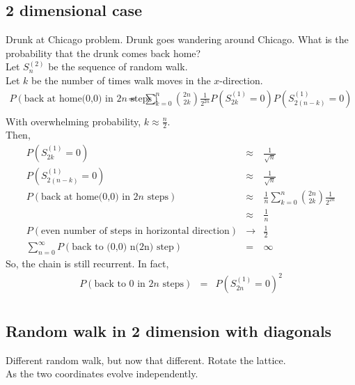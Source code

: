   \subsection*{2 dimensional case}
    Drunk at Chicago problem. Drunk goes wandering around Chicago.
    What is the probability that the drunk comes back home?\\
    Let $S_n^{(2)}$ be the sequence of random walk.\\
    Let $k$ be the number of times walk moves in the $x$-direction.
    \begin{eqnarray*}
      P(\text{back at home(0,0) in $2n$ steps})
      & = & \sum_{k = 0}^n \binom{2n}{2k} \frac{1}{2^{2n}} 
        P(S_{2k}^{(1)} = 0) P(S_{2(n-k)}^{(1)} = 0)\\
    \end{eqnarray*}
    With overwhelming probability, $k \approx \frac{n}{2}$.\\
    Then,
    \begin{eqnarray*}
      P(S_{2k}^{(1)} = 0) & \approx & \frac{1}{\sqrt{n}}\\
      P(S_{2(n - k)}^{(1)} = 0) & \approx & \frac{1}{\sqrt{n}}\\
      P(\text{back at home(0,0) in $2n$ steps})
        & \approx & \frac{1}{n} \sum_{k = 0}^n \binom{2n}{2k} 
          \frac{1}{2^{2n}} \\
        & \approx & \frac{1}{n}\\
    P(\text{even number of steps in horizontal direction}) &\to& 
      \frac{1}{2}\\
      \sum_{n = 0}^{\infty}P(\text{back to (0,0) n(2n) step}) &=& 
      \infty
    \end{eqnarray*}
    So, the chain is still recurrent. In fact,
    \begin{eqnarray*}
      P(\text{back to 0 in $2n$ steps})
      & = & P(S_{2n}^{(1)} = 0)^2\\
    \end{eqnarray*}

  \subsection*{Random walk in 2 dimension with diagonals}
    Different random walk, but now that different. Rotate the
    lattice.\\
    As the two coordinates evolve independently.
